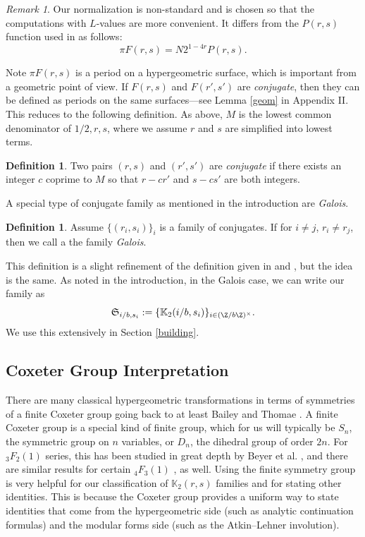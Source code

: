 \documentclass[12pt]{amsart}
\theoremstyle{definition}
\newtheorem{definition}[theorem]{Definition}
\theoremstyle{remark}
\newtheorem{remark}{Remark}
\begin{document}
\begin{remark}
    Our normalization is non-standard and is chosen so that the computations with $L$-values are more convenient. It differs from the $P(r,s)$ function used in \cite{aglt} as follows: $$\pi F(r,s)=N2^{1-4r}P(r,s).$$ 
\end{remark}




Note $\pi F(r,s)$ is a period on a hypergeometric surface, which is important from a geometric point of view. If $F(r,s)$ and $F(r',s')$ are \textit{conjugate}, then they can be defined as periods on the same surfaces---see Lemma \ref{geom} in Appendix II. This reduces to the following definition. As above, $M$ is the lowest common denominator of $1/2,r,s$, where we assume $r$ and $s$ are simplified into lowest terms.
 \begin{definition}\label{conj}
   Two pairs $(r,s)$ and $(r',s')$ are \textit{conjugate}  if there exists an integer $c$ coprime to $M$ so that $r-cr'$ and $s-cs'$ are both integers. 
 \end{definition}


A special type of conjugate family as mentioned in the introduction are \textit{Galois}.

\begin{definition}\label{galois}
  Assume $\{(r_i,s_i)\}_i$ is a family of conjugates. If for $i\neq j$, $r_i\neq r_j$, then we call a the family \textit{Galois}.
\end{definition} 


This definition is a slight refinement of the definition given in \cite{aglt} and \cite{grove}, but the idea is the same. As noted in the introduction, in the Galois case, we can write our family as $$\mathfrak S_{i/b,s_i}:=\{\mathbb{K}_2(i/b,s_i)\}_{i\in (\Z/b\Z)^\times}.$$  We use this extensively in Section \ref{building}.
 

\subsection{Coxeter Group Interpretation} \label{coxe}
 

There are many classical hypergeometric transformations in terms of symmetries of a finite Coxeter group going back to at least Bailey \cite{bailey} and Thomae \cite{thomae}. A finite Coxeter group is a special kind of finite group, which for us will typically be $S_n$, the symmetric group on $n$ variables, or $D_n$, the dihedral group of order $2n$. For ${}_3F_2(1)$ series, this has been studied in great depth by Beyer et al. \cite{coxeter}, and there are similar results for certain ${}_4F_3(1)$ \cite{formichella}, \cite{green} as well. Using the finite symmetry group is very helpful for our classification of $\mathbb{K}_2(r,s)$ families and for stating other identities. This is because the Coxeter group provides a uniform way to state identities that come from the hypergeometric side (such as analytic continuation formulas) and the modular forms side (such as the Atkin--Lehner involution). 
\end{document}
